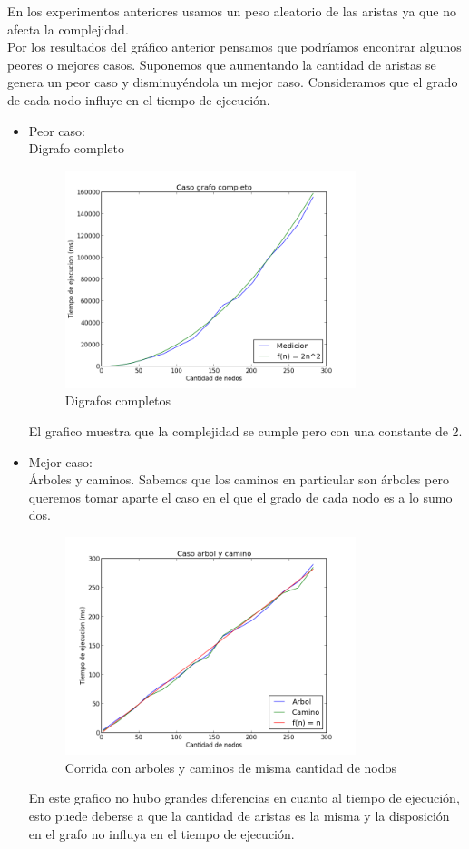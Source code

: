 En los experimentos anteriores usamos un peso aleatorio de las aristas ya que no afecta la complejidad. \\
Por los resultados del gr\'afico anterior pensamos que podr\'iamos encontrar algunos peores o mejores casos. Suponemos que aumentando la cantidad de aristas se genera un peor caso y disminuy\'endola un mejor caso. Consideramos que el grado de cada nodo influye en el tiempo de ejecuci\'on.
\newpage
\begin{itemize}
	\item Peor caso: \\
	Digrafo completo
	\begin{figure}[H]
  \centering
  \includegraphics[width=0.8\textwidth]{Problema3/salida3}
  \caption{Digrafos completos}
  \label{fig: ej1_exp1_columnas}
\end{figure}
	El grafico muestra que la complejidad se cumple pero con una constante de 2. 
	\item Mejor caso: \\ 
	\'Arboles y caminos. Sabemos que los caminos en particular son \'arboles pero queremos tomar aparte el caso en el que el grado de cada nodo es a lo sumo dos.
	\begin{figure}[H]
  \centering
  \includegraphics[width=0.8\textwidth]{Problema3/salida4}
  \caption{Corrida con arboles y caminos de misma cantidad de nodos}
  \label{fig: ej1_exp1_columnas}
\end{figure}
	En este grafico no hubo grandes diferencias en cuanto al tiempo de ejecuci\'on, esto puede deberse a que la cantidad de aristas es la misma y la disposici\'on en el grafo no influya en el tiempo de ejecuci\'on.
\end{itemize}

